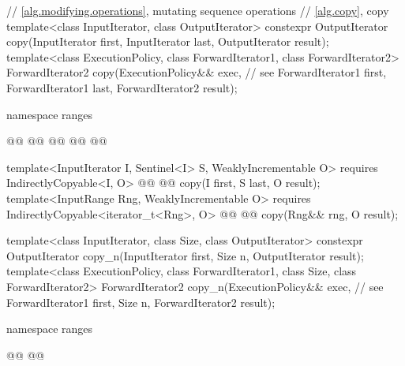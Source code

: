 \begin{codeblock}
  // \ref{alg.modifying.operations}, mutating sequence operations
  // \ref{alg.copy}, copy
  template<class InputIterator, class OutputIterator>
    constexpr OutputIterator copy(InputIterator first, InputIterator last,
                                  OutputIterator result);
  template<class ExecutionPolicy, class ForwardIterator1, class ForwardIterator2>
    ForwardIterator2 copy(ExecutionPolicy&& exec, // see 
                          ForwardIterator1 first, ForwardIterator1 last,
                          ForwardIterator2 result);
\end{codeblock}\begin{addedblock}\begin{codeblock}
  namespace ranges {
    @@
    @@
      @@
      @@
    @\newtxt{\};}@

    template<InputIterator I, Sentinel<I> S, WeaklyIncrementable O>
      requires IndirectlyCopyable<I, O>
      @@
      @@
        copy(I first, S last, O result);
    template<InputRange Rng, WeaklyIncrementable O>
      requires IndirectlyCopyable<iterator_t<Rng>, O>
      @@
      @@
        copy(Rng&& rng, O result);
  }
\end{codeblock}\end{addedblock}\begin{codeblock}
  template<class InputIterator, class Size, class OutputIterator>
    constexpr OutputIterator copy_n(InputIterator first, Size n,
                                    OutputIterator result);
  template<class ExecutionPolicy, class ForwardIterator1, class Size,
           class ForwardIterator2>
    ForwardIterator2 copy_n(ExecutionPolicy&& exec, // see 
                            ForwardIterator1 first, Size n,
                            ForwardIterator2 result);
\end{codeblock}\begin{addedblock}\begin{codeblock}
  namespace ranges {
    @@
    @@

}
\end{codeblock}
\end{addedblock}
